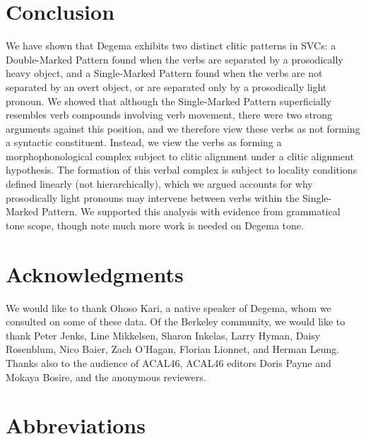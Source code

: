 \documentclass[output=paper]{langsci/langscibook}
\begin{document}
\section{Conclusion}

We have shown that Degema exhibits two distinct clitic patterns in SVCs: a Double-Marked Pattern found when the verbs are separated by a prosodically heavy object, and a Single-Marked Pattern found when the verbs are not separated by an overt object, or are separated only by a prosodically light pronoun. We showed that although the Single-Marked Pattern superficially resembles verb compounds involving verb movement, there were two strong arguments against this position, and we therefore view these verbs as not forming a syntactic constituent. Instead, we view the verbs as forming a morphophonological complex subject to clitic alignment under a clitic alignment hypothesis. The formation of this verbal complex is subject to locality conditions defined linearly (not hierarchically), which we argued accounts for why prosodically light pronouns may intervene between verbs within the Single-Marked Pattern. We supported this analysis with evidence from grammatical tone scope, though note much more work is needed on Degema tone.

\section*{Acknowledgments}


We would like to thank Ohoso Kari, a native speaker of Degema, whom we consulted on some of these data. Of the Berkeley community, we would like to thank Peter Jenks, Line Mikkelsen, Sharon Inkelas, Larry Hyman, Daisy Rosenblum, Nico Baier, Zach O’Hagan, Florian Lionnet, and Herman Leung. Thanks also to the audience of ACAL46, ACAL46 editors Doris Payne and Mokaya Bosire, and the anonymous reviewers.


\section*{Abbreviations}
\end{document}
